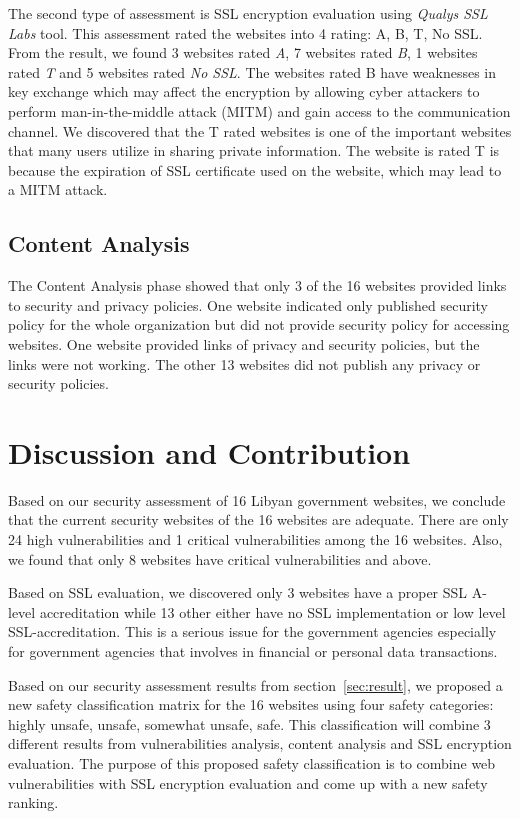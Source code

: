 \documentclass[conference]{IEEEtran}
\begin{document}
The second type of assessment is SSL encryption evaluation
using \emph{Qualys SSL Labs} tool. This assessment rated the websites into 4 rating: A, B, T, No SSL. From the result, we found 3 websites rated \emph{A}, 7 websites rated \emph{B}, 1 websites rated \emph{T} and 5 websites rated \emph{No SSL}. The websites rated B have weaknesses 
in key exchange 
which may affect
the encryption by allowing cyber attackers to perform
man-in-the-middle
attack (MITM) and gain access to the communication
channel. We discovered that the T rated websites is one of the important websites that many users utilize in sharing private information. The website is rated T is because the expiration of SSL certificate used on the website, which may lead to a MITM attack.

\subsection{Content Analysis}

The Content Analysis phase showed that only 3 of the 16 websites
provided links to security and privacy policies. One website indicated only published security
policy for the whole organization but did not provide security policy for accessing websites. One website
provided links of privacy and security policies, but the links
were not working. The other 13 websites did not publish any privacy or
security policies.

\section{Discussion and Contribution}

Based on our security assessment of 16 Libyan government websites, we conclude that the current security websites of the 16 websites are adequate. There are only 24 high vulnerabilities and 1 critical vulnerabilities among the 16 websites. Also, we found that only 8 websites have critical vulnerabilities and above.

Based on SSL evaluation, we discovered only 3 websites have a proper SSL A-level accreditation while 13 other either have no SSL implementation or low  level SSL-accreditation. This is a serious issue for the government agencies especially for government agencies that involves in financial or personal data transactions.

Based on our security assessment results from
section~\ref{sec:result},
we proposed a new safety classification matrix for the 16
websites using
four safety categories: highly unsafe, unsafe, somewhat unsafe, safe. This classification will combine 3 different results from
vulnerabilities analysis, content analysis
and SSL encryption evaluation. The purpose of this proposed safety classification is to combine web vulnerabilities with SSL encryption evaluation and come up with a new
safety ranking.
\end{document}
